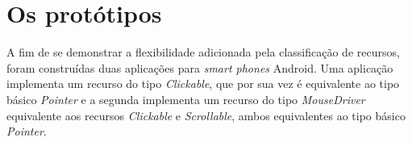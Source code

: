 \section{Os protótipos}
\label{sec:osPrototipos}

A fim de se demonstrar a flexibilidade adicionada pela classificação de recursos, foram construídas duas aplicações para \emph{smart phones} Android. Uma aplicação implementa um recurso do tipo \emph{Clickable}, que por sua vez é equivalente ao tipo básico \emph{Pointer} e a segunda implementa um recurso do tipo \emph{MouseDriver} equivalente aos recursos \emph{Clickable} e \emph{Scrollable}, ambos equivalentes ao tipo básico \emph{Pointer}.